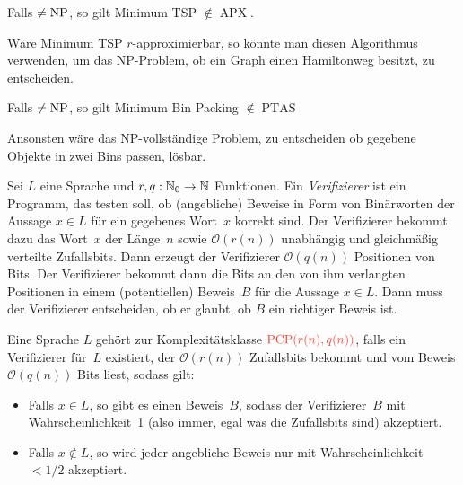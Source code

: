 \documentclass{cheat-sheet}
\DeclareMathOperator{\APX}{APX} %
\DeclareMathOperator{\NP}{NP} %
\let\P\relax %
\DeclareMathOperator{\P}{P} %
\DeclareMathOperator{\PTAS}{PTAS} %
\DeclareMathOperator{\PCP}{PCP} %
\renewcommand{\O}{\mathcal{O}} %
\newcommand{\Defn}[1]{\textcolor{DefinitionColor}{#1}}
\begin{document}
\begin{satz}
  Falls $\P \neq \NP$, so gilt Minimum TSP $\not\in \APX$.
\end{satz}

\begin{beweisidee}
  Wäre Minimum TSP $r$-approximierbar, so könnte man diesen Algorithmus verwenden, um das NP-Problem, ob ein Graph einen Hamiltonweg besitzt, zu entscheiden.
\end{beweisidee}

\begin{satz}
  Falls $\P \neq \NP$, so gilt Minimum Bin Packing $\not\in \PTAS$
\end{satz}

\begin{beweisidee}
  Ansonsten wäre das NP-vollständige Problem, zu entscheiden ob gegebene Objekte in zwei Bins passen, lösbar.
\end{beweisidee}


\begin{defn}
  Sei $L$ eine Sprache und $r, q : \mathbb{N}_0 \to \mathbb{N}$ Funktionen.
  Ein \emph{Verifizierer} ist ein Programm, das testen soll, ob (angebliche) Beweise in Form von Binärworten der Aussage $x \in L$ für ein gegebenes Wort~$x$ korrekt sind.
  Der Verifizierer bekommt dazu das Wort~$x$ der Länge~$n$ sowie $\O(r(n))$ unabhängig und gleichmäßig verteilte Zufallsbits.
  Dann erzeugt der Verifizierer $\O(q(n))$ Positionen von Bits.
  Der Verifizierer bekommt dann die Bits an den von ihm verlangten Positionen in einem (potentiellen) Beweis~$B$ für die Aussage $x \in L$.
  Dann muss der Verifizierer entscheiden, ob er glaubt, ob $B$ ein richtiger Beweis ist.
\end{defn}

\begin{defn}
  Eine Sprache $L$ gehört zur Komplexitätsklasse $\Defn{\PCP(r(n), q(n))}$, falls ein Verifizierer für~$L$ existiert, der $\O(r(n))$ Zufallsbits bekommt und vom Beweis $\O(q(n))$ Bits liest, sodass gilt:
  \begin{itemize}
    \item Falls $x \in L$, so gibt es einen Beweis~$B$, sodass der Verifizierer~$B$ mit Wahrscheinlichkeit~1 (also immer, egal was die Zufallsbits sind) akzeptiert.
    \item Falls $x \not\in L$, so wird jeder angebliche Beweis nur mit Wahrscheinlichkeit $< 1/2$ akzeptiert.
  \end{itemize}
\end{defn}
\end{document}
